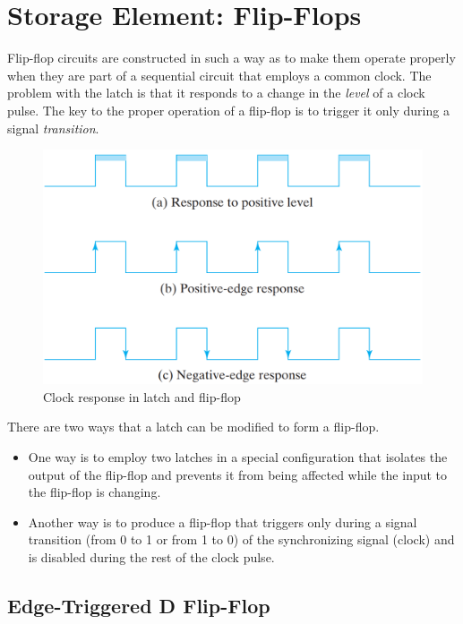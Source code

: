 \section{Storage Element: Flip-Flops}
\label{sec:stor-ele-flip-flop}

Flip-flop circuits are constructed in such a way as to make them operate properly when they are part of a sequential circuit that employs a common clock. The problem with the latch is that it responds to a change in the \textit{level} of a clock pulse. The key to the proper operation of a flip-flop is to trigger it only during a signal \textit{transition}.

\begin{figure}[H]
  \centering
  \includegraphics[width=\linewidth]{img/fig-5.8.png}
  \caption{Clock response in latch and flip-flop}
  \label{fig:5.8}
\end{figure}

There are two ways that a latch can be modified to form a flip-flop.
\begin{itemize}
  \item One way is to employ two latches in a special configuration that isolates the output of the flip-flop and prevents it from being affected while the input to the flip-flop is changing.
  \item Another way is to produce a flip-flop that triggers only during a signal transition (from 0 to 1 or from 1 to 0) of the synchronizing signal (clock) and is disabled during the rest of the clock pulse.
\end{itemize}

\subsection{Edge-Triggered D Flip-Flop}
\label{subsec:edge-trig-d-flip-flop}

